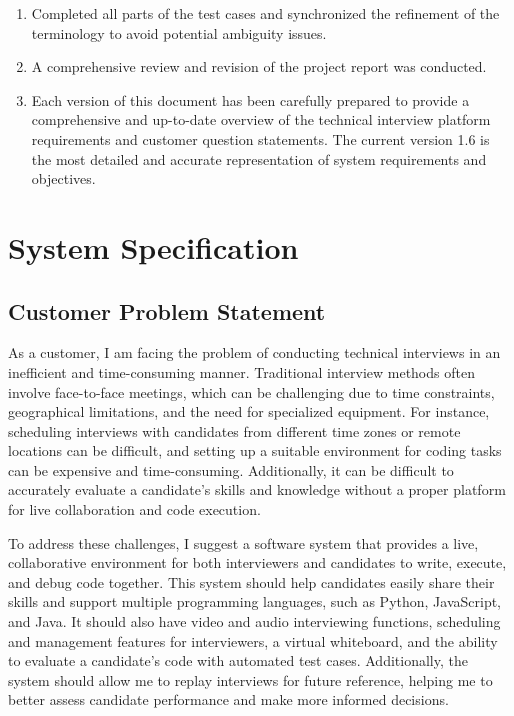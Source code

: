 \documentclass{article}
\begin{document}
\begin{itemize}
\begin{enumerate}
        \item Completed all parts of the test cases and synchronized the refinement of the terminology to avoid potential ambiguity issues.
        \item A comprehensive review and revision of the project report was conducted.
        \item Each version of this document has been carefully prepared to provide a comprehensive and up-to-date overview of the technical interview platform requirements and customer question statements. The current version 1.6 is the most detailed and accurate representation of system requirements and objectives.
    \end{enumerate}
\end{itemize}


\section{System Specification}
\subsection{Customer Problem Statement}

As a customer, I am facing the problem of conducting technical interviews in an inefficient and time-consuming manner. Traditional interview methods often involve face-to-face meetings, which can be challenging due to time constraints, geographical limitations, and the need for specialized equipment. For instance, scheduling interviews with candidates from different time zones or remote locations can be difficult, and setting up a suitable environment for coding tasks can be expensive and time-consuming. Additionally, it can be difficult to accurately evaluate a candidate’s skills and knowledge without a proper platform for live collaboration and code execution.

To address these challenges, I suggest a software system that provides a live, collaborative environment for both interviewers and candidates to write, execute, and debug code together. This system should help candidates easily share their skills and support multiple programming languages, such as Python, JavaScript, and Java. It should also have video and audio interviewing functions, scheduling and management features for interviewers, a virtual whiteboard, and the ability to evaluate a candidate’s code with automated test cases. Additionally, the system should allow me to replay interviews for future reference, helping me to better assess candidate performance and make more informed decisions.
\end{document}
